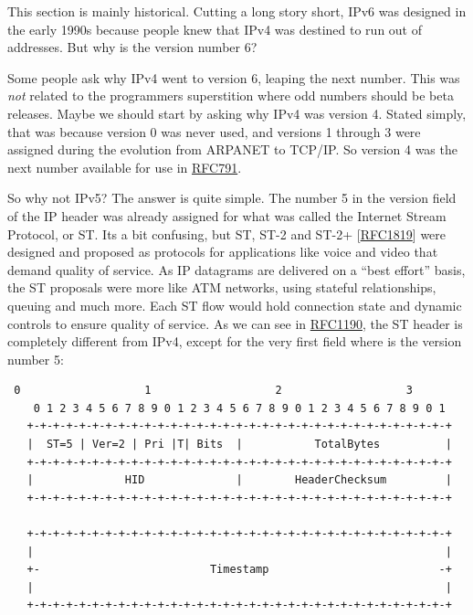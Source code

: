 \documentclass[
]{article}
\begin{document}
This section is mainly historical. Cutting a long story short, IPv6 was
designed in the early 1990s because people knew that IPv4 was destined
to run out of addresses. But why is the version number 6?

Some people ask why IPv4 went to version 6, leaping the next number.
This was \emph{not} related to the programmer\textquotesingle s
superstition where odd numbers should be beta releases. Maybe we should
start by asking why IPv4 was version 4. Stated simply, that was because
version 0 was never used, and versions 1 through 3 were assigned during
the evolution from ARPANET to TCP/IP. So version 4 was the next number
available for use in
\href{https://www.rfc-editor.org/info/rfc791}{RFC791}.

So why not IPv5? The answer is quite simple. The number 5 in the version
field of the IP header was already assigned for what was called the
Internet Stream Protocol, or ST. It\textquotesingle s a bit confusing,
but ST, ST-2 and ST-2+
{[}\href{https://www.rfc-editor.org/info/rfc1819}{RFC1819}{]} were
designed and proposed as protocols for applications like voice and video
that demand quality of service. As IP datagrams are delivered on a
``best effort'' basis, the ST proposals were more like ATM networks,
using stateful relationships, queuing and much more. Each ST flow would
hold connection state and dynamic controls to ensure quality of service.
As we can see in
\href{https://www.rfc-editor.org/info/rfc1190}{RFC1190}, the ST header
is completely different from IPv4, except for the very first field where
is the version number 5:

\begin{verbatim}
 0                   1                   2                   3
    0 1 2 3 4 5 6 7 8 9 0 1 2 3 4 5 6 7 8 9 0 1 2 3 4 5 6 7 8 9 0 1
   +-+-+-+-+-+-+-+-+-+-+-+-+-+-+-+-+-+-+-+-+-+-+-+-+-+-+-+-+-+-+-+-+
   |  ST=5 | Ver=2 | Pri |T| Bits  |           TotalBytes          |
   +-+-+-+-+-+-+-+-+-+-+-+-+-+-+-+-+-+-+-+-+-+-+-+-+-+-+-+-+-+-+-+-+
   |              HID              |        HeaderChecksum         |
   +-+-+-+-+-+-+-+-+-+-+-+-+-+-+-+-+-+-+-+-+-+-+-+-+-+-+-+-+-+-+-+-+

   +-+-+-+-+-+-+-+-+-+-+-+-+-+-+-+-+-+-+-+-+-+-+-+-+-+-+-+-+-+-+-+-+
   |                                                               |
   +-                          Timestamp                          -+
   |                                                               |
   +-+-+-+-+-+-+-+-+-+-+-+-+-+-+-+-+-+-+-+-+-+-+-+-+-+-+-+-+-+-+-+-+
\end{verbatim}
\end{document}
